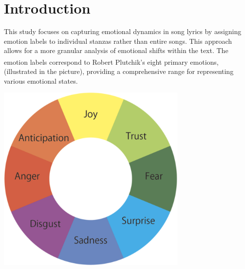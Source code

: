 \chapter*{Introduction}
\label{ch:Introduction}

\noindent
\begin{minipage}{0.65\textwidth}
    This study focuses on capturing emotional dynamics in song lyrics by assigning
    emotion labels to individual stanzas rather than entire songs.
    This approach allows for a more granular analysis of emotional shifts within
    the text.
    The emotion labels correspond to Robert Plutchik's eight primary emotions\textsuperscript{\cite{plutchik1980general}},
    (illustrated in the picture),
    providing a comprehensive range for representing various emotional states.
\end{minipage}
\hfill
\begin{minipage}{0.27\textwidth}
    \centering
    \includegraphics[width=\textwidth]{pictures/plutchik_primary_emotions.png}
    \label{fig:primary_emotions}
\end{minipage}\\


